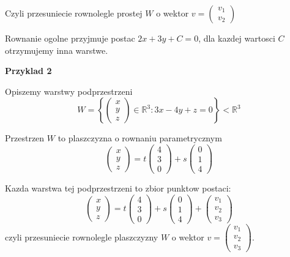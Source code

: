\documentclass{article}
\begin{document}
Czyli przesuniecie rownolegle prostej $W$ o wektor $v = \begin{pmatrix} v_{1}\\v_{2}
\end{pmatrix}$

Rownanie ogolne przyjmuje postac $2x + 3y + C = 0$, dla kazdej wartosci $C$ otrzymujemy inna warstwe.

\textbf{Przyklad 2}

Opiszemy warstwy podprzestrzeni $$W = \left\{ \begin{pmatrix} x\\ y\\z\end{pmatrix} \in \mathbb{R}^{3}: 3x - 4y + z = 0 \right\} <  \mathbb{R}^{3}$$

Przestrzen $W$ to plaszczyzna o rownaniu parametrycznym $$\begin{pmatrix} x\\y\\z
\end{pmatrix} = 
t \begin{pmatrix} 4\\3\\0 \end{pmatrix} +
s \begin{pmatrix} 0\\1\\4 \end{pmatrix}$$

Kazda warstwa tej podprzestrzeni to zbior punktow postaci:
$$ 
\begin{pmatrix} x\\y\\z
\end{pmatrix} = 
t \begin{pmatrix} 4\\3\\0 \end{pmatrix} +
s \begin{pmatrix} 0\\1\\4 \end{pmatrix} +
\begin{pmatrix} v_{1}\\v_{2}\\v_{3} \end{pmatrix} 
$$
czyli przesuniecie rownolegle plaszczyzny $W$ o wektor $v = \begin{pmatrix} v_{1}\\v_{2}\\v_{3} \end{pmatrix}$.
\end{document}

